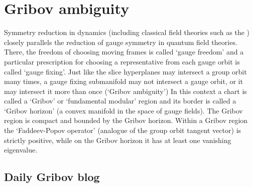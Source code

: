 
\chapter{Gribov ambiguity}
\label{c-Gribov}


Symmetry reduction in dynamics (including classical field theories such
as the \NSe) closely parallels the reduction of gauge symmetry in
quantum field theories. There, the freedom of choosing moving frames
 is called `gauge freedom' and a
particular prescription for choosing a representative from each gauge
orbit is called `gauge fixing'. Just like the slice hyperplanes
may intersect a group orbit many times, a gauge
fixing submanifold may not intersect a gauge orbit, or it may intersect
it more than once (`Gribov ambiguity') In this
context a chart is called a `Gribov' or `fundamental modular' region and
its border is called a `Gribov horizon' (a convex manifold in the
space of gauge fields). The Gribov region is compact and bounded by the
Gribov horizon. Within a Gribov region the `Faddeev-Popov operator'
(analogue of the group orbit tangent vector) is strictly positive, while on
the Gribov horizon it has at least one vanishing eigenvalue.



\section{Daily Gribov blog}
\label{s-DailyGBlog}



